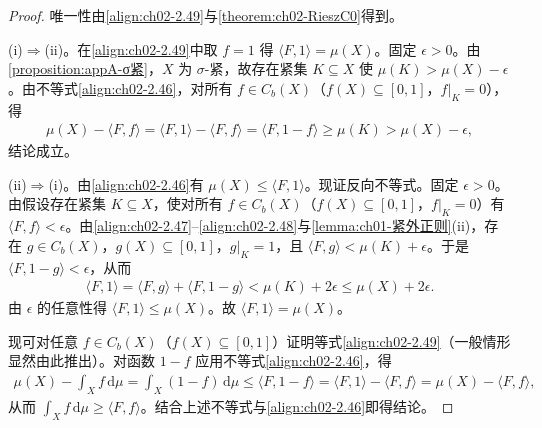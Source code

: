 \documentclass[../../main.tex]{subfiles}%
\begin{document}
\begin{proof}
唯一性由\eqref{align:ch02-2.49}与\cref{theorem:ch02-RieszC0}得到。

(i)$\Rightarrow$(ii)。在\eqref{align:ch02-2.49}中取 $f=1$ 得 $\langle F,1\rangle=\mu(X)$。固定 $\epsilon>0$。由\cref{proposition:appA-σ紧}，$X$ 为 $\sigma$-紧，故存在紧集 $K\subseteq X$ 使 $\mu(K)>\mu(X)-\epsilon$。由不等式\eqref{align:ch02-2.46}，对所有 $f\in C_b(X)$（$f(X)\subseteq[0,1]$，$f|_K=0$），得
\begin{align*}
\mu(X)-\langle F,f\rangle=\langle F,1\rangle-\langle F,f\rangle=\langle F,1-f\rangle\geqslant\mu(K)>\mu(X)-\epsilon,
\end{align*}
结论成立。

(ii)$\Rightarrow$(i)。由\eqref{align:ch02-2.46}有 $\mu(X)\leqslant\langle F,1\rangle$。现证反向不等式。固定 $\epsilon>0$。由假设存在紧集 $K\subseteq X$，使对所有 $f\in C_b(X)$（$f(X)\subseteq[0,1]$，$f|_K=0$）有 $\langle F,f\rangle<\epsilon$。由\eqref{align:ch02-2.47}--\eqref{align:ch02-2.48}与\cref{lemma:ch01-紧外正则}(ii)，存在 $g\in C_b(X)$，$g(X)\subseteq[0,1]$，$g|_K=1$，且 $\langle F,g\rangle<\mu(K)+\epsilon$。于是 $\langle F,1-g\rangle<\epsilon$，从而
\begin{align*}
\langle F,1\rangle=\langle F,g\rangle+\langle F,1-g\rangle<\mu(K)+2\epsilon\leqslant\mu(X)+2\epsilon.
\end{align*}
由 $\epsilon$ 的任意性得 $\langle F,1\rangle\leqslant\mu(X)$。故 $\langle F,1\rangle=\mu(X)$。

现可对任意 $f\in C_b(X)$（$f(X)\subseteq[0,1]$）证明等式\eqref{align:ch02-2.49}（一般情形显然由此推出）。对函数 $1-f$ 应用不等式\eqref{align:ch02-2.46}，得
\begin{align*}
\mu(X)-\int_X f\,\mathrm{d}\mu=\int_X(1-f)\,\mathrm{d}\mu\leqslant\langle F,1-f\rangle
=\langle F,1\rangle-\langle F,f\rangle=\mu(X)-\langle F,f\rangle,
\end{align*}
从而 $\int_X f\,\mathrm{d}\mu\geqslant\langle F,f\rangle$。结合上述不等式与\eqref{align:ch02-2.46}即得结论。
\end{proof}
\end{document}
